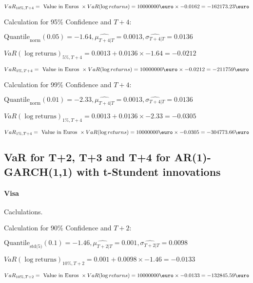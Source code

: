 \indent\indent $VaR_{10\%, T + 4} = \text{ Value in Euros } \times VaR(\log returns) = 10 000 000 \text{\euro} \times-0.0162 = -162173.23 \text{\euro}$\newline




Calculation for 95\% Confidence and $T+4$:

\indent\indent $\text{Quantile}_\text{norm}(0.05) = -1.64,\hat{\mu_{T+4|T}} = 0.0013, \hat{\sigma_{T+4|T}} = 0.0136$

\indent\indent $VaR(\log \text{returns})_{5\%, T + 4} = 0.0013 + 0.0136\times-1.64 = -0.0212$

\indent\indent $VaR_{5\%, T + 4} = \text{ Value in Euros } \times VaR(\log returns) = 10 000 000 \text{\euro} \times-0.0212 = -211759 \text{\euro}$\newline




Calculation for 99\% Confidence and $T+4$:

\indent\indent $\text{Quantile}_\text{norm}(0.01) = -2.33,\hat{\mu_{T+4|T}} = 0.0013, \hat{\sigma_{T+4|T}} = 0.0136$

\indent\indent $VaR(\log \text{returns})_{1\%, T + 4} = 0.0013 + 0.0136\times-2.33 = -0.0305$

\indent\indent $VaR_{1\%, T + 4} = \text{ Value in Euros } \times VaR(\log returns) = 10 000 000 \text{\euro} \times-0.0305 = -304773.66 \text{\euro}$\newline
\subsection{VaR for T+2, T+3 and T+4 for AR(1)-GARCH(1,1) with t-Stundent innovations}
\paragraph{Visa} Caclulations.\newline \indent 





Calculation for 90\% Confidence and $T+2$:

\indent\indent $\text{Quantile}_\text{std(5)}(0.1) = -1.46,\hat{\mu_{T+2|T}} = 0.001, \hat{\sigma_{T+2|T}} = 0.0098$

\indent\indent $VaR(\log \text{returns})_{10\%, T + 2} = 0.001 + 0.0098\times-1.46 = -0.0133$

\indent\indent $VaR_{10\%, T + 2} = \text{ Value in Euros } \times VaR(\log returns) = 10 000 000 \text{\euro} \times-0.0133 = -132845.59 \text{\euro}$\newline




